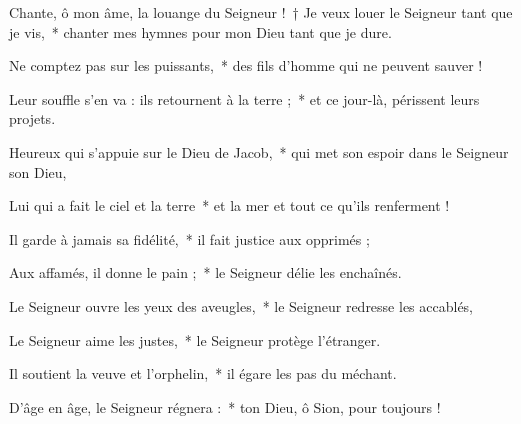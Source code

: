 \item Chante, ô mon âme, la louange du Seigneur !~† Je veux louer le Seigneur tant que je vis,~* chanter mes hymnes pour mon Dieu tant que je dure.

\item Ne comptez pas sur les puissants,~* des fils d'homme qui ne peuvent sauver !

\item Leur souffle s'en va : ils retournent à la terre ;~* et ce jour-là, périssent leurs projets.

\item Heureux qui s'appuie sur le Dieu de Jacob,~* qui met son espoir dans le Seigneur son Dieu,

\item Lui qui a fait le ciel et la terre~* et la mer et tout ce qu'ils renferment ! 

\item Il garde à jamais sa fidélité,~* il fait justice aux opprimés ; 

\item Aux affamés, il donne le pain ;~* le Seigneur délie les enchaînés.

\item Le Seigneur ouvre les yeux des aveugles,~* le Seigneur redresse les accablés, 

\item Le Seigneur aime les justes,~* le Seigneur protège l'étranger. 

\item Il soutient la veuve et l'orphelin,~* il égare les pas du méchant.

\item D'âge en âge, le Seigneur régnera :~* ton Dieu, ô Sion, pour toujours !
